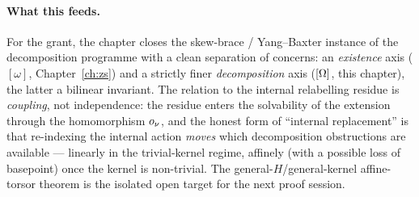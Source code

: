 \paragraph{What this feeds.}
For the grant, the chapter closes the skew-brace / Yang--Baxter instance of the
decomposition programme with a clean separation of concerns: an \emph{existence}
axis ($[\omega]$, Chapter~\ref{ch:zs}) and a strictly finer \emph{decomposition}
axis ($[\Omega]$, this chapter), the latter a bilinear invariant. The relation to the
internal relabelling residue is \emph{coupling}, not independence: the residue
enters the solvability of the extension through the homomorphism $o_\nu$, and the
honest form of ``internal replacement'' is that re-indexing the internal action
\emph{moves} which decomposition obstructions are available --- linearly in the
trivial-kernel regime, affinely (with a possible loss of basepoint) once the kernel
is non-trivial. The general-$H$/general-kernel affine-torsor theorem is the isolated
open target for the next proof session.
